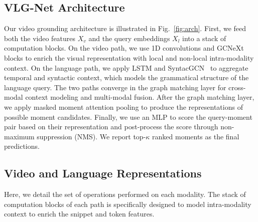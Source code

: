 \documentclass[10pt,twocolumn,letterpaper]{article}
\begin{document}
\subsection{VLG-Net Architecture}
Our video grounding architecture is illustrated in Fig.~\ref{fig:arch}. 
First, we feed both the video features $X_v$ and the query embeddings $X_l$ into a stack of computation blocks. On the video path, we use 1D convolutions and GCNeXt~\cite{Xu_2020_CVPR} blocks to enrich the visual representation with local and non-local intra-modality context. On the language path, we apply LSTM and SyntacGCN~\cite{huang2020aligned} to aggregate temporal and syntactic context, which models the grammatical structure of the language query. The two paths converge in the graph matching layer for cross-modal context modeling and multi-modal fusion. After the graph matching layer, we apply masked moment attention pooling to produce the representations of possible moment candidates. Finally, we use an MLP to score the query-moment pair based on their representation and post-process the score through non-maximum suppression (NMS). We report top-$\kappa$ ranked moments as the final predictions.


\subsection{Video and Language Representations}\label{subsec: GCNeXt}
Here, we detail the set of operations performed on each modality. The stack of computation blocks of each path is specifically designed to model intra-modality context to enrich the snippet and token features.
\end{document}
